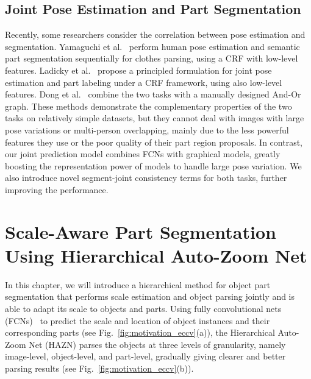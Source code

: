 \subsection{Joint Pose Estimation and Part Segmentation}
Recently, some researchers consider the correlation between pose estimation and segmentation. Yamaguchi et al.~\cite{yamaguchi2012parsing} perform human pose estimation and semantic part segmentation sequentially for clothes parsing, using a CRF with low-level features. Ladicky et al.~\cite{ladicky2013human} propose a principled formulation for joint pose estimation and part labeling under a CRF framework, using also low-level features. Dong et al.~\cite{dong2014towards} combine the two tasks with a manually designed And-Or graph. These methods demonstrate the complementary properties of the two tasks on relatively simple datasets, but they cannot deal with images with large pose variations or multi-person overlapping, mainly due to the less powerful features they use or the poor quality of their part region proposals. In contrast, our joint prediction model combines FCNs with graphical models, greatly boosting the representation power of models to handle large pose variation. We also introduce novel segment-joint consistency terms for both tasks, further improving the performance.

\section{Scale-Aware Part Segmentation Using Hierarchical Auto-Zoom Net}
\label{sec:hazn}
In this chapter, we will introduce a hierarchical method for object part segmentation that performs scale estimation
and object parsing jointly and is able to adapt its scale to objects and parts. Using fully convolutional nets (FCNs)~\cite{long2015fully} to predict
the scale and location of object instances and their corresponding parts (see Fig.~\ref{fig:motivation_eccv}(a)), the Hierarchical Auto-Zoom Net (HAZN)
parses the objects at three levels of granularity, namely image-level, object-level, and part-level, gradually giving clearer and better parsing results
(see Fig.~\ref{fig:motivation_eccv}(b)).

